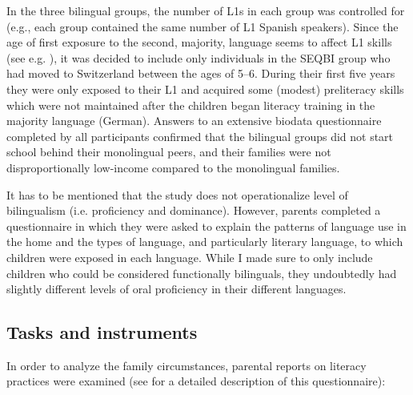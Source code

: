 \documentclass[output=paper,modfonts,nonflat,newtxmath]{langsci/langscibook}
\begin{document}
In the three bilingual groups, the number of L1s in each group was controlled for (e.g., each group contained the same number of L1 Spanish speakers). Since the age of first exposure to the second, majority, language seems to affect L1 skills (see e.g. \citealt{CoboLewisEtAl2002}), it was decided to include only individuals in the SEQBI group who had moved to Switzerland between the ages of 5–6. During their first five years they were only exposed to their L1 and acquired some (modest) preliteracy skills which were not maintained after the children began literacy training in the majority language (German). Answers to an extensive biodata questionnaire completed by all participants confirmed that the bilingual groups did not start school behind their monolingual peers, and their families were not disproportionally low-income compared to the monolingual families.

It has to be mentioned that the study does not operationalize level of bilingualism (i.e. proficiency and dominance). However, parents completed a questionnaire in which they were asked to explain the patterns of language use in the home and the types of language, and particularly literary language, to which children were exposed in each language. While I made sure to only include children who could be considered functionally bilinguals, they undoubtedly had slightly different levels of oral proficiency in their different languages.

\subsection{Tasks and instruments}
\label{sec:pfenninger:3.3}

In order to analyze the family circumstances, parental reports on literacy practices were examined (see \citealt{Pfenninger2017} for a detailed description of this questionnaire):
\end{document}
